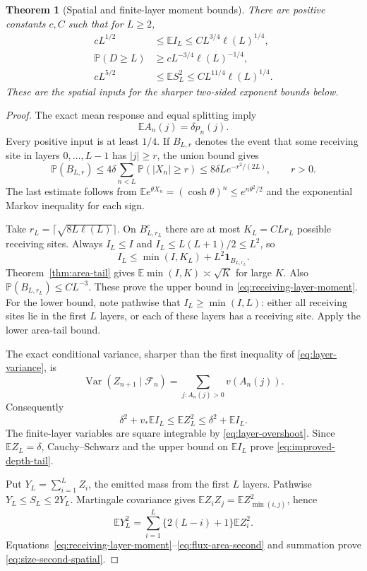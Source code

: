 \documentclass[11pt]{article}
\numberwithin{equation}{section}
\newtheorem{theorem}{Theorem}[section]
\theoremstyle{definition}
\newcommand{\E}{\mathbb E}
\newcommand{\Prob}{\mathbb P}
\newcommand{\ind}{\mathbf 1}
\newcommand{\Var}{\operatorname{Var}}
\begin{document}
\begin{theorem}[Spatial and finite-layer moment bounds]\label{thm:spatial-bounds}
There are positive constants $c,C$ such that for $L\ge2$,
\begin{align}
 c L^{1/2}&\le\E I_L\le C L^{3/4}\ell(L)^{1/4},\label{eq:receiving-layer-moment}\\
 \Prob(D\ge L)&\ge c L^{-3/4}\ell(L)^{-1/4},\label{eq:improved-depth-tail}\\
 c L^{5/2}&\le\E S_L^2\le C L^{11/4}\ell(L)^{1/4}.\label{eq:size-second-spatial}
\end{align}
These are the spatial inputs for the sharper two-sided exponent bounds below.
\end{theorem}
\begin{proof}
The exact mean response and equal splitting imply
\begin{equation}\label{eq:mean-heat-kernel}
 \E A_n(j)=\delta p_n(j).
\end{equation}
Every positive input is at least $1/4$. If $B_{L,r}$ denotes the event that some receiving site in layers $0,\ldots,L-1$ has $|j|\ge r$, the union bound gives
\begin{equation}\label{eq:spatial-confinement}
 \Prob(B_{L,r})\le4\delta\sum_{n<L}\Prob(|X_n|\ge r)
 \le8\delta L e^{-r^2/(2L)},\qquad r>0.
\end{equation}
The last estimate follows from $\E e^{\theta X_n}=(\cosh\theta)^n\le e^{n\theta^2/2}$ and the exponential Markov inequality for each sign.

Take $r_L=\lceil\sqrt{8L\ell(L)}\rceil$. On $B_{L,r_L}^c$ there are at most $K_L=C L r_L$ possible receiving sites. Always $I_L\le I$ and $I_L\le L(L+1)/2\le L^2$, so
\[
 I_L\le\min(I,K_L)+L^2\ind_{B_{L,r_L}}.
\]
Theorem~\ref{thm:area-tail} gives $\E\min(I,K)\asymp\sqrt K$ for large $K$. Also $\Prob(B_{L,r_L})\le C L^{-3}$. These prove the upper bound in \eqref{eq:receiving-layer-moment}. For the lower bound, note pathwise that $I_L\ge\min(I,L)$: either all receiving sites lie in the first $L$ layers, or each of these layers has a receiving site. Apply the lower area-tail bound.

The exact conditional variance, sharper than the first inequality of \eqref{eq:layer-variance}, is
\[
 \Var(Z_{n+1}\mid\mathcal F_n)
 =\sum_{j:A_n(j)>0}v(A_n(j)).
\]
Consequently
\begin{equation}\label{eq:flux-area-second}
 \delta^2+v_*\E I_L\le\E Z_L^2\le\delta^2+\E I_L.
\end{equation}
The finite-layer variables are square integrable by \eqref{eq:layer-overshoot}. Since $\E Z_L=\delta$, Cauchy--Schwarz and the upper bound on $\E I_L$ prove \eqref{eq:improved-depth-tail}.

Put $Y_L=\sum_{i=1}^L Z_i$, the emitted mass from the first $L$ layers. Pathwise $Y_L\le S_L\le2Y_L$. Martingale covariance gives $\E Z_iZ_j=\E Z_{\min(i,j)}^2$, hence
\[
 \E Y_L^2=\sum_{i=1}^L\{2(L-i)+1\}\E Z_i^2.
\]
Equations~\eqref{eq:receiving-layer-moment}--\eqref{eq:flux-area-second} and summation prove \eqref{eq:size-second-spatial}.
\end{proof}
\end{document}
